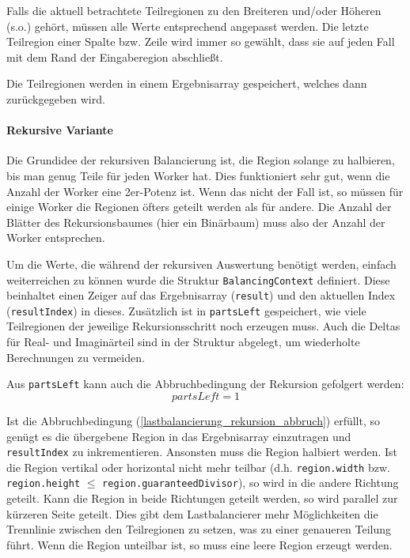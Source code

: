 Falls die aktuell betrachtete Teilregionen zu den Breiteren und/oder Höheren (s.o.) gehört, müssen alle Werte entsprechend angepasst werden.
Die letzte Teilregion einer Spalte bzw. Zeile wird immer so gewählt, dass sie auf jeden Fall mit dem Rand der Eingaberegion abschließt.

Die Teilregionen werden in einem Ergebnisarray gespeichert, welches dann zurückgegeben wird.

\paragraph*{Rekursive Variante}\label{lastbalancierung_naiv_rekursion}
Die Grundidee der rekursiven Balancierung ist, die Region solange zu halbieren, bis man genug Teile für jeden Worker hat.
Dies funktioniert sehr gut, wenn die Anzahl der Worker eine 2er-Potenz ist.
Wenn das nicht der Fall ist, so müssen für einige Worker die Regionen öfters geteilt werden als für andere.
Die Anzahl der Blätter des Rekursionsbaumes (hier ein Binärbaum) muss also der Anzahl der Worker entsprechen.

Um die Werte, die während der rekursiven Auswertung benötigt werden, einfach weiterreichen zu können wurde die Struktur \verb|BalancingContext| definiert.
Diese beinhaltet einen Zeiger auf das Ergebnisarray (\verb|result|) und den aktuellen Index (\verb|resultIndex|) in dieses.
Zusätzlich ist in \verb|partsLeft| gespeichert, wie viele Teilregionen der jeweilige Rekursionsschritt noch erzeugen muss.
Auch die Deltas für Real- und Imaginärteil sind in der Struktur abgelegt, um wiederholte Berechnungen zu vermeiden.

Aus \verb|partsLeft| kann auch die Abbruchbedingung der Rekursion gefolgert werden:
\begin{equation}\label{lastbalancierung_rekursion_abbruch}
	partsLeft = 1
\end{equation}

Ist die Abbruchbedingung (\ref{lastbalancierung_rekursion_abbruch}) erfüllt, so genügt es die übergebene Region in das Ergebnisarray einzutragen und \verb|resultIndex| zu inkrementieren.
Ansonsten muss die Region halbiert werden. Ist die Region vertikal oder horizontal nicht mehr teilbar (d.h. \verb|region.width| bzw. \verb|region.height| $\leq$ \verb|region.guaranteedDivisor|), so wird in die andere Richtung geteilt.
Kann die Region in beide Richtungen geteilt werden, so wird parallel zur kürzeren Seite geteilt.
Dies gibt dem Lastbalancierer mehr Möglichkeiten die Trennlinie zwischen den Teilregionen zu setzen, was zu einer genaueren Teilung führt.
Wenn die Region unteilbar ist, so muss eine leere Region erzeugt werden.

